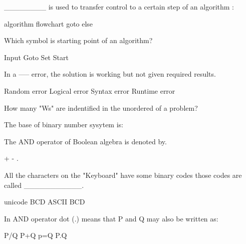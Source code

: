 \documentclass{exam}
\begin{document}
\begin{questions}
\_\_\_\_\_\_\_\_ is used to transfer control to a  certain step of an algorithm :\\
\begin{oneparchoices}
\choice algorithm
\choice flowchart
\choice goto
\choice else
\end{oneparchoices}
\question 

Which symbol is starting point of an algorithm?\\
\begin{oneparchoices}
\choice Input
\choice Goto
\choice Set
\choice Start
\end{oneparchoices}
\question 

In a ----- error, the solution is working but not given required results.\\
\begin{oneparchoices}
\choice Random error
\choice Logical error
\choice Syntax error
\choice Runtime error
\end{oneparchoices}
\question 

How many "Ws" are indentified in the unordered of a  problem?\\
\begin{oneparchoices}
\end{oneparchoices}
\question 

The base of binary number sysytem is:\\
\begin{oneparchoices}
\end{oneparchoices}
\question 

The AND operator of Boolean algebra is denoted by.\\
\begin{oneparchoices}
\choice *
\choice +
\choice -
\choice .
\end{oneparchoices}
\question 

All the characters on the "Keyboard" have some binary codes those codes are called \_\_\_\_\_\_\_\_\_\_\_.\\
\begin{oneparchoices}
\choice unicode
\choice BCD
\choice ASCII
\choice BCD
\end{oneparchoices}
\question 

In AND operator dot (.) means that P and Q may also be written as:\\
\begin{oneparchoices}
\choice P/Q
\choice P+Q
\choice p=Q
\choice P.Q
\end{oneparchoices}
\question 


\end{questions}
\end{document}
